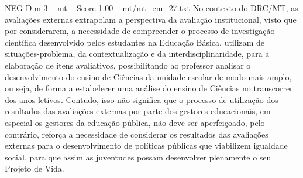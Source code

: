 \begin{textsample}{NEG Dim 3 – mt – Score 1.00 – mt/mt\_em\_27.txt}
No contexto do DRC/MT, as avaliações externas extrapolam a perspectiva da avaliação institucional, visto que por considerarem, a necessidade de compreender o processo de investigação científica desenvolvido pelos estudantes na Educação Básica, utilizam de situações-problema, da contextualização e da interdisciplinaridade, para a elaboração de itens avaliativos, possibilitando ao professor analisar o desenvolvimento do ensino de Ciências da unidade escolar de modo mais amplo, ou seja, de forma a estabelecer uma análise do ensino de Ciências no transcorrer dos anos letivos.
Contudo, isso não significa que o processo de utilização dos resultados das avaliações externas por parte dos gestores educacionais, em especial os gestores da educação pública, não deve ser aperfeiçoado, pelo contrário, reforça a necessidade de considerar os resultados das avaliações externas para o desenvolvimento de políticas públicas que viabilizem igualdade social, para que assim as juventudes possam desenvolver plenamente o seu Projeto de Vida.

\end{textsample}
